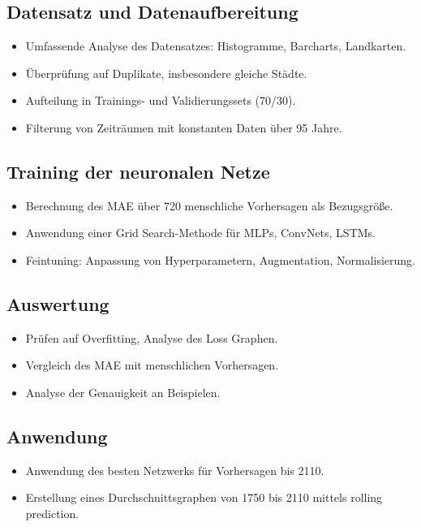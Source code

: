 \documentclass[acmtog, authorversion]{acmart} %
\begin{document}
\subsection*{Datensatz und Datenaufbereitung}
\begin{itemize}
    \item Umfassende Analyse des Datensatzes: Histogramme, Barcharts, Landkarten.
    \item Überprüfung auf Duplikate, insbesondere gleiche Städte.
    \item Aufteilung in Trainings- und Validierungssets (70/30).
    \item Filterung von Zeiträumen mit konstanten Daten über 95 Jahre.
\end{itemize}

\subsection*{Training der neuronalen Netze}
\begin{itemize}
    \item Berechnung des MAE über 720 menschliche Vorhersagen als Bezugsgröße.
    \item Anwendung einer Grid Search-Methode für MLPs, ConvNets, LSTMs.
    \item Feintuning: Anpassung von Hyperparametern, Augmentation, Normalisierung.
\end{itemize}

\subsection*{Auswertung}
\begin{itemize}
    \item Prüfen auf Overfitting, Analyse des Loss Graphen.
    \item Vergleich des MAE mit menschlichen Vorhersagen.
    \item Analyse der Genauigkeit an Beispielen.
\end{itemize}

\subsection*{Anwendung}
\begin{itemize}
    \item Anwendung des besten Netzwerks für Vorhersagen bis 2110.
    \item Erstellung eines Durchschnittsgraphen von 1750 bis 2110 mittels rolling prediction.
\end{itemize}
\end{document}
